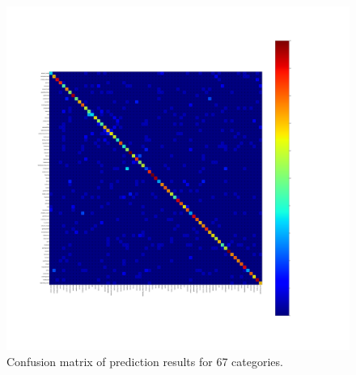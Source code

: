 \FloatBarrier
\begin{figure}[h!]
  \centering
  \includegraphics[width=1.2\textwidth]{img/matrix.pdf}
  \centering
  \caption{Confusion matrix of prediction results for 67 categories.}
  \label{fig:confusion_matrix}
\end{figure}
\FloatBarrier